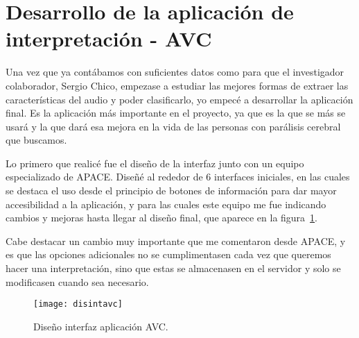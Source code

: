 \section{Desarrollo de la aplicación de interpretación - AVC}
Una vez que ya contábamos con suficientes datos como para que el investigador colaborador, Sergio Chico, empezase a estudiar las mejores formas de extraer las características del audio y poder clasificarlo, yo empecé a desarrollar la aplicación final. Es la aplicación más importante en el proyecto, ya que es la que se más se usará y la que dará esa mejora en la vida de las personas con parálisis cerebral que buscamos.

Lo primero que realicé fue el diseño de la interfaz junto con un equipo especializado de APACE. Diseñé al rededor de 6 interfaces iniciales, en las cuales se destaca el uso desde el principio de botones de información para dar mayor accesibilidad a la aplicación, y para las cuales este equipo me fue indicando cambios y mejoras hasta llegar al diseño final, que aparece en la figura~\ref{fig:dinteravc}. 

Cabe destacar un cambio muy importante que me comentaron desde APACE, y es que las opciones adicionales no se cumplimentasen cada vez que queremos hacer una interpretación, sino que estas se almacenasen en el servidor y solo se modificasen cuando sea necesario.

\begin{figure}
	\centering
	\texttt{[image: disintavc]}
	\caption{Diseño interfaz aplicación AVC.}
	\label{fig:dinteravc}
\end{figure}

